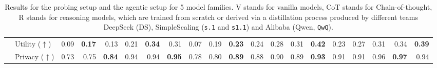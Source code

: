 \begin{table}[tbp]
\begin{adjustbox}{width=\textwidth}
{\begin{tabular}{ll rrr|rrr|rrr|rrrrrr|rrr}
\hline \rowcolor{orange!5}
\multicolumn{20}{l}{\rule{0pt}{2.2ex}\hspace{1ex}\textbf{Agentic (AgentDAM)}} \\ \hline
          & Utility ($\uparrow$) & 0.09 & \textbf{0.17} & 0.13 & 0.21 & \textbf{0.34} & 0.31 & 0.07 & 0.19 & \textbf{0.23} & 0.24 & 0.28 & 0.31 & \textbf{0.42} & 0.23 & 0.27 & 0.31 & 0.34 & \textbf{0.39} \\
          & Privacy ($\uparrow$) & 0.73 & 0.75 & \textbf{0.84} & 0.94 & 0.94 & \textbf{0.95} & 0.78 & 0.80 & \textbf{0.89} & 0.88 & 0.90 & 0.89 & \textbf{0.93} & 0.91 & 0.91 & 0.96 & \textbf{0.97} & 0.94 \\
\bottomrule
\end{tabular}
}
\end{adjustbox}
\caption{Results for the probing setup and the agentic setup for 5 model families. V stands for vanilla models, CoT stands for Chain-of-thought, R stands for reasoning models, which are trained from scratch or derived via a distillation process produced by different teams DeepSeek (DS), SimpleScaling (\texttt{s.1} and \texttt{s1.1}) and Alibaba (Qwen, \texttt{QwQ}).}
\label{tab:main_results}
\end{table}

